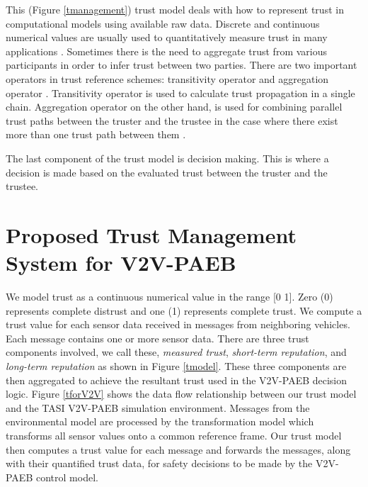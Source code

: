 \documentclass[conference]{IEEEtran}
\begin{document}
This (Figure \ref{tmanagement}) trust model deals with how to represent trust in computational models using available raw data. Discrete and continuous numerical values are usually used to quantitatively measure trust in many applications \cite{trustSurvey2015}. Sometimes there is the need to aggregate trust from various participants in order to infer trust between two parties. There are two important operators in trust reference schemes: transitivity operator and aggregation operator \cite{trustAggreg06}. Transitivity operator is used to calculate trust propagation in a single chain. Aggregation operator on the other hand, is used for combining parallel trust paths between the truster and the trustee in the case where there exist more than one trust path between them \cite{logicUnProb2001}.

The last component of the trust model is decision making. This is where a decision is made based on the evaluated trust between the truster and the trustee.

\section{Proposed Trust Management System for V2V-PAEB} \label{contribution}
We model trust as a continuous numerical value in the range [0 1]. Zero (0) represents complete distrust and one (1) represents complete trust. We compute a trust value for each sensor data received in messages from neighboring vehicles. Each message contains one or more sensor data. There are three trust components involved, we call these, \textit{measured trust},  \textit{short-term reputation}, and \textit{long-term reputation} as shown in Figure \ref{tmodel}. These three components are then aggregated to achieve the resultant trust used in the V2V-PAEB decision logic. Figure \ref{tforV2V} shows the data flow relationship between our trust model and the TASI V2V-PAEB simulation environment. Messages from the environmental model are processed by the transformation model which transforms all sensor values onto a common reference frame. Our trust model then computes a trust value for each message and forwards the messages, along with their quantified trust data, for safety decisions to be made by the V2V-PAEB control model.

\end{document}
